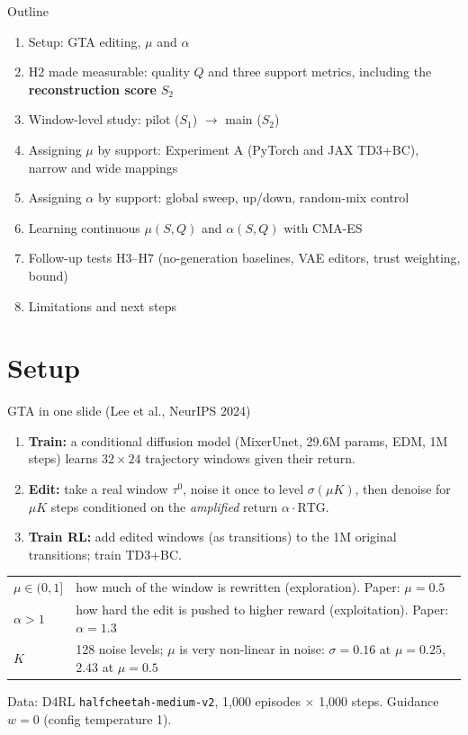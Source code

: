\documentclass[aspectratio=169,11pt]{beamer}
\begin{document}
\begin{frame}{Outline}
\begin{enumerate}
\item Setup: GTA editing, $\mu$ and $\alpha$
\item H2 made measurable: quality $Q$ and three support metrics, including the \textbf{reconstruction score} $S_2$
\item Window-level study: pilot ($S_1$) $\to$ main ($S_2$)
\item Assigning $\mu$ by support: Experiment A (PyTorch and JAX TD3+BC), narrow and wide mappings
\item Assigning $\alpha$ by support: global sweep, up/down, random-mix control
\item Learning continuous $\mu(S,Q)$ and $\alpha(S,Q)$ with CMA-ES
\item Follow-up tests H3--H7 (no-generation baselines, VAE editors, trust weighting, bound)
\item Limitations and next steps
\end{enumerate}
\end{frame}

\section{Setup}
\begin{frame}{GTA in one slide (Lee et al., NeurIPS 2024)}
\begin{enumerate}
\item \textbf{Train:} a conditional diffusion model (MixerUnet, 29.6M params, EDM, 1M steps) learns $32\times24$ trajectory windows given their return.
\item \textbf{Edit:} take a real window $\tau^0$, noise it once to level $\sigma(\mu K)$, then denoise for $\mu K$ steps conditioned on the \emph{amplified} return $\alpha\cdot\text{RTG}$.
\item \textbf{Train RL:} add edited windows (as transitions) to the 1M original transitions; train TD3+BC.
\end{enumerate}
\vspace{0.5em}
\begin{tabularx}{\linewidth}{lY}
\toprule
$\mu\in(0,1]$ & how much of the window is rewritten (exploration). Paper: $\mu=0.5$\\
$\alpha>1$ & how hard the edit is pushed to higher reward (exploitation). Paper: $\alpha=1.3$\\
$K$ & 128 noise levels; $\mu$ is very non-linear in noise: $\sigma=0.16$ at $\mu=0.25$, $2.43$ at $\mu=0.5$\\
\bottomrule
\end{tabularx}
\vspace{0.5em}

Data: D4RL \texttt{halfcheetah-medium-v2}, 1{,}000 episodes $\times$ 1{,}000 steps. Guidance $w=0$ (config temperature 1).
\end{frame}
\end{document}
